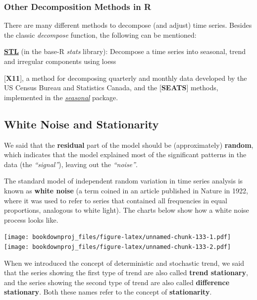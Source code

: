 \documentclass[
]{article}
\begin{document}
\hypertarget{other-decomposition-methods-in-r}{%
\subsubsection{Other Decomposition Methods in R}\label{other-decomposition-methods-in-r}}

There are many different methods to decompose (and adjust) time series. Besides the classic \emph{decompose} function, the following can be mentioned:

\href{https://stat.ethz.ch/R-manual/R-devel/library/stats/html/stl.html}{\textbf{STL}} (in the base-R \emph{stats} library): Decompose a time series into seasonal, trend and irregular components using loess

{[}\textbf{X11}{]}, a method for decomposing quarterly and monthly data developed by the US Census Bureau and Statistics Canada, and the {[}\textbf{SEATS}{]} methods, implemented in the \href{http://www.seasonal.website/seasonal.html}{\emph{seasonal}} package.

\hypertarget{white-noise-and-stationarity}{%
\subsection{White Noise and Stationarity}\label{white-noise-and-stationarity}}

We said that the \textbf{residual} part of the model should be (approximately) \textbf{random}, which indicates that the model explained most of the significant patterns in the data (the \emph{``signal''}), leaving out the \emph{``noise''}.

The standard model of independent random variation in time series analysis is known as \textbf{white noise} (a term coined in an article published in Nature in 1922, where it was used to refer to series that contained all frequencies in equal proportions, analogous to white light). The charts below show how a white noise process looks like.

\texttt{[image: bookdownproj\_files/figure-latex/unnamed-chunk-133-1.pdf]} \texttt{[image: bookdownproj\_files/figure-latex/unnamed-chunk-133-2.pdf]}

When we introduced the concept of deterministic and stochastic trend, we said that the series showing the first type of trend are also called \textbf{trend stationary}, and the series showing the second type of trend are also called \textbf{difference stationary}. Both these names refer to the concept of \textbf{stationarity}.
\end{document}
